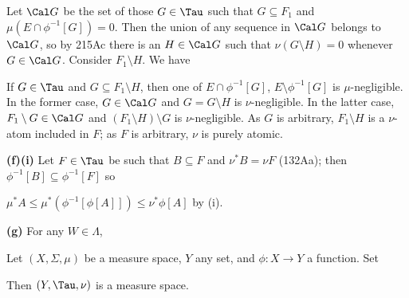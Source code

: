 {Let $\Cal G$ be the set of those $G\in\Tau$ such that $G\subseteq F_1$ and
$\mu(E\cap\phi^{-1}[G])=0$.   Then the union of any sequence in $\Cal G$
belongs to $\Cal G$, so by 215Ac there is an $H\in\Cal G$ such that
$\nu(G\setminus H)=0$ whenever $G\in\Cal G$.   Consider $F_1\setminus H$.
We have


\noindent If $G\in\Tau$ and $G\subseteq F_1\setminus H$,
then one of $E\cap\phi^{-1}[G]$, $E\setminus\phi^{-1}[G]$ is
$\mu$-negligible.
In the former case, $G\in\Cal G$ and $G=G\setminus H$ is $\nu$-negligible.
In the
latter case, $F_1\setminus G\in\Cal G$ and $(F_1\setminus H)\setminus G$ is
$\nu$-negligible.   As $G$ is arbitrary, $F_1\setminus H$ is a $\nu$-atom
included in $F$;  as $F$ is arbitrary, $\nu$ is purely atomic.

\medskip

{\bf (f)(i)} Let $F\in\Tau$ be such that $B\subseteq F$ and $\nu^*B=\nu F$
(132Aa);  then $\phi^{-1}[B]\subseteq\phi^{-1}[F]$ so


\medskip

 $\mu^*A\le\mu^*(\phi^{-1}[\phi[A]])\le\nu^*\phi[A]$ by (i).

\medskip

{\bf (g)} For any $W\in\Lambda$,

}%


 Let $(X,\Sigma,\mu)$ be a measure space, $Y$
any set, and $\phi:X\to Y$ a function.   Set


\noindent Then $(Y,\Tau,\nu)$ is a measure space.

